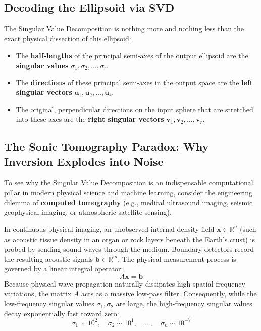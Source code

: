 \subsection{Decoding the Ellipsoid via SVD}
The Singular Value Decomposition is nothing more and nothing less than the exact physical dissection of this ellipsoid:
\begin{itemize}
    \item The \textbf{half-lengths} of the principal semi-axes of the output ellipsoid are the \textbf{singular values} $\sigma_1, \sigma_2, \dots, \sigma_r$.
    \item The \textbf{directions} of these principal semi-axes in the output space are the \textbf{left singular vectors} $\mathbf{u}_1, \mathbf{u}_2, \dots, \mathbf{u}_r$.
    \item The original, perpendicular directions on the input sphere that are stretched into these axes are the \textbf{right singular vectors} $\mathbf{v}_1, \mathbf{v}_2, \dots, \mathbf{v}_r$.
\end{itemize}

\subsection{The Sonic Tomography Paradox: Why Inversion Explodes into Noise}
To see why the Singular Value Decomposition is an indispensable computational pillar in modern physical science and machine learning, consider the engineering dilemma of \textbf{computed tomography} (e.g., medical ultrasound imaging, seismic geophysical imaging, or atmospheric satellite sensing).

In continuous physical imaging, an unobserved internal density field $\mathbf{x} \in \mathbb{R}^n$ (such as acoustic tissue density in an organ or rock layers beneath the Earth's crust) is probed by sending sound waves through the medium. Boundary detectors record the resulting acoustic signals $\mathbf{b} \in \mathbb{R}^m$. The physical measurement process is governed by a linear integral operator:
\begin{equation}
A \mathbf{x} = \mathbf{b}
\end{equation}
Because physical wave propagation naturally dissipates high-spatial-frequency variations, the matrix $A$ acts as a massive low-pass filter. Consequently, while the low-frequency singular values $\sigma_1, \sigma_2$ are large, the high-frequency singular values decay exponentially fast toward zero:
\begin{equation}
\sigma_1 \sim 10^2, \quad \sigma_2 \sim 10^1, \quad \dots, \quad \sigma_n \sim 10^{-7}
\end{equation}

